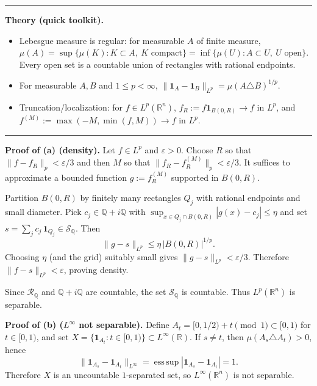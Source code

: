 \documentclass[12pt,a4paper]{article}
\theoremstyle{plain}
\theoremstyle{definition}
\theoremstyle{remark}
\theoremstyle{remark}
\newcommand{\tighthrule}{\vspace{0.6\baselineskip}\hrule\vspace{0.8\baselineskip}}
\newenvironment{spacy}{\begingroup\setlength{\parskip}{6pt}\setlength{\parindent}{0pt}}{\endgroup}
\theoremstyle{definition}
\begin{document}
\tighthrule
\begin{spacy}
	\textbf{Theory (quick toolkit).}
	\begin{itemize}
		\item Lebesgue measure is regular: for measurable $A$ of finite measure,
		$\mu(A)=\sup\{\mu(K):K\subset A,\ K\text{ compact}\}=\inf\{\mu(U):A\subset U,\ U\text{ open}\}$.
		Every open set is a countable union of rectangles with rational endpoints.
		\item For measurable $A,B$ and $1\le p<\infty$,
		$\|\mathbf 1_A-\mathbf 1_B\|_{L^p}=\mu(A\triangle B)^{1/p}$.
		\item Truncation/localization: for $f\in L^p(\mathbb R^n)$, $f_R:=f\mathbf 1_{B(0,R)}\to f$ in $L^p$,
		and $f^{(M)}:=\max(-M,\min(f,M))\to f$ in $L^p$.
	\end{itemize}
\end{spacy}

\tighthrule
\begin{spacy}
	\textbf{Proof of (a) (density).}
	Let $f\in L^{p}$ and $\varepsilon>0$.
	Choose $R$ so that $\|f-f_R\|_{p}<\varepsilon/3$ and then $M$ so that $\|f_R-f_R^{(M)}\|_{p}<\varepsilon/3$.
	It suffices to approximate a bounded function $g:=f_R^{(M)}$ supported in $B(0,R)$.
	
	Partition $B(0,R)$ by finitely many rectangles $Q_j$ with rational endpoints and small diameter.
	Pick $c_j\in\mathbb Q+i\mathbb Q$ with $\sup_{x\in Q_j\cap B(0,R)}|g(x)-c_j|\le\eta$ and set
	$s=\sum_j c_j\,\mathbf 1_{Q_j}\in\mathcal S_{\mathbb Q}$.
	Then
	\[
	\|g-s\|_{L^p}\le \eta\,|B(0,R)|^{1/p}.
	\]
	Choosing $\eta$ (and the grid) suitably small gives $\|g-s\|_{L^p}<\varepsilon/3$.
	Therefore $\|f-s\|_{L^p}<\varepsilon$, proving density.
	
	Since $\mathcal R_{\mathbb Q}$ and $\mathbb Q+i\mathbb Q$ are countable, the set $\mathcal S_{\mathbb Q}$ is countable.
	Thus $L^p(\mathbb R^n)$ is separable.
	
	\medskip
	
	\textbf{Proof of (b) ($L^\infty$ not separable).}
	Define $A_t=[0,1/2)+t \pmod 1\subset[0,1)$ for $t\in[0,1)$, and set $X=\{\mathbf 1_{A_t}: t\in[0,1)\}\subset L^\infty(\mathbb R)$.
	If $s\ne t$, then $\mu(A_s\triangle A_t)>0$, hence
	\[
	\|\mathbf 1_{A_s}-\mathbf 1_{A_t}\|_{L^\infty}
	= \operatorname*{ess\,sup} |\mathbf 1_{A_s}-\mathbf 1_{A_t}| = 1 .
	\]
	Therefore $X$ is an uncountable $1$-separated set, so $L^\infty(\mathbb R^n)$ is not separable.
\end{spacy}
\end{document}
